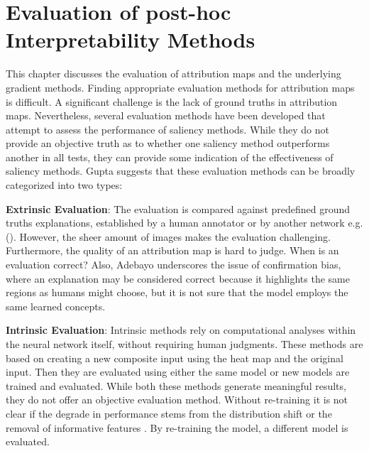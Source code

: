 \newpage

\chapter{Evaluation of post-hoc Interpretability Methods}
\label{sec:evaluation}


This chapter discusses the evaluation of attribution maps and the underlying gradient methods. Finding appropriate evaluation methods for attribution maps is difficult. A significant challenge is the lack of ground truths in attribution maps. Nevertheless, several evaluation methods have been developed that attempt to assess the performance of saliency methods. While they do not provide an objective truth as to whether one saliency method outperforms another in all tests, they can provide some indication of the effectiveness of saliency methods. Gupta\cite{gupta2022new} suggests that these evaluation methods can be broadly categorized into two types:

\textbf{Extrinsic Evaluation}: 
The evaluation is compared against predefined ground truths explanations, established by a human annotator or by another network e.g.(\cite{zhang2018}). However, the sheer amount of images makes the evaluation challenging. Furthermore, the quality of an attribution map is hard to judge. When is an evaluation correct? Also, Adebayo \cite{adebayo2020sanity} underscores the issue of confirmation bias, where an explanation may be considered correct because it highlights the same regions as humans might choose, but it is not sure that the model employs the same learned concepts. 

\textbf{Intrinsic Evaluation}: 
Intrinsic methods rely on computational analyses within the neural network itself, without requiring human judgments. These methods are based on creating a new composite input using the heat map and the original input. Then they are evaluated using either the same model\cite{dabkowski2017real} or new models are trained and evaluated\cite{hooker2019benchmark}. While both these methods generate meaningful results, they do not offer an objective evaluation method. Without re-training it is not clear if the degrade in performance stems from the distribution shift or the removal of informative features \cite{hooker2019benchmark}. By re-training the model, a different model is evaluated. 
\\


